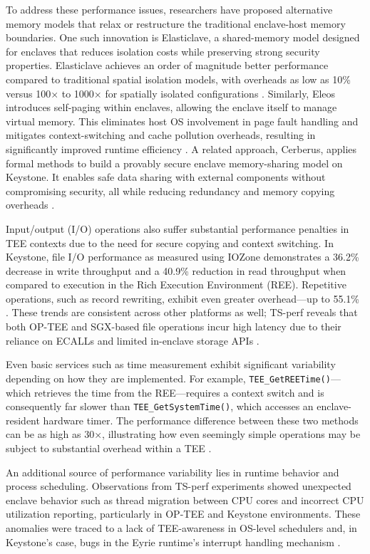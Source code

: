 To address these performance issues, researchers have proposed alternative memory models that relax or restructure the traditional enclave-host memory boundaries. One such innovation is Elasticlave, a shared-memory model designed for enclaves that reduces isolation costs while preserving strong security properties. Elasticlave achieves an order of magnitude better performance compared to traditional spatial isolation models, with overheads as low as 10\% versus 100× to 1000× for spatially isolated configurations \cite{yu2022elasticlave}. Similarly, Eleos introduces self-paging within enclaves, allowing the enclave itself to manage virtual memory. This eliminates host OS involvement in page fault handling and mitigates context-switching and cache pollution overheads, resulting in significantly improved runtime efficiency \cite{orenbach2023eleos}. A related approach, Cerberus, applies formal methods to build a provably secure enclave memory-sharing model on Keystone. It enables safe data sharing with external components without compromising security, all while reducing redundancy and memory copying overheads \cite{lee2022cerberus}.

Input/output (I/O) operations also suffer substantial performance penalties in TEE contexts due to the need for secure copying and context switching. In Keystone, file I/O performance as measured using IOZone demonstrates a 36.2\% decrease in write throughput and a 40.9\% reduction in read throughput when compared to execution in the Rich Execution Environment (REE). Repetitive operations, such as record rewriting, exhibit even greater overhead—up to 55.1\% \cite{dayeol2019keystone}. These trends are consistent across other platforms as well; TS-perf reveals that both OP-TEE and SGX-based file operations incur high latency due to their reliance on ECALLs and limited in-enclave storage APIs \cite{Suzaki2021}.

Even basic services such as time measurement exhibit significant variability depending on how they are implemented. For example, \texttt{TEE\_GetREETime()}—which retrieves the time from the REE—requires a context switch and is consequently far slower than \texttt{TEE\_GetSystemTime()}, which accesses an enclave-resident hardware timer. The performance difference between these two methods can be as high as 30×, illustrating how even seemingly simple operations may be subject to substantial overhead within a TEE \cite{Suzaki2021}.

An additional source of performance variability lies in runtime behavior and process scheduling. Observations from TS-perf experiments showed unexpected enclave behavior such as thread migration between CPU cores and incorrect CPU utilization reporting, particularly in OP-TEE and Keystone environments. These anomalies were traced to a lack of TEE-awareness in OS-level schedulers and, in Keystone's case, bugs in the Eyrie runtime's interrupt handling mechanism \cite{Suzaki2021}.

